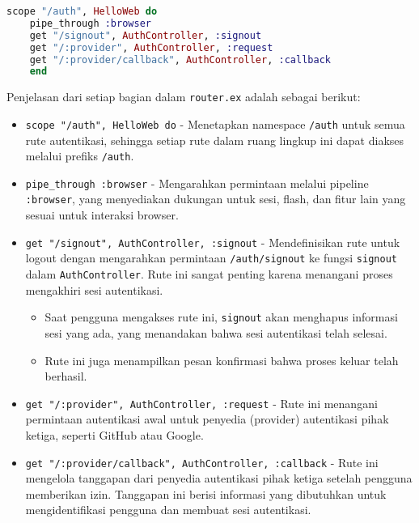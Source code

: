 \begin{lstlisting}[language=Elixir, caption={\texttt{lib/hello\_web/router.ex}}]
	scope "/auth", HelloWeb do
	pipe_through :browser
	get "/signout", AuthController, :signout
	get "/:provider", AuthController, :request
	get "/:provider/callback", AuthController, :callback
	end
\end{lstlisting}

Penjelasan dari setiap bagian dalam \texttt{router.ex} adalah sebagai berikut:

\begin{itemize}
	\item \texttt{scope "/auth", HelloWeb do} - Menetapkan namespace \texttt{/auth} untuk semua rute autentikasi, sehingga setiap rute dalam ruang lingkup ini dapat diakses melalui prefiks \texttt{/auth}.
	\item \texttt{pipe\_through :browser} - Mengarahkan permintaan melalui pipeline \texttt{:browser}, yang menyediakan dukungan untuk sesi, flash, dan fitur lain yang sesuai untuk interaksi browser.
	\item \texttt{get "/signout", AuthController, :signout} - Mendefinisikan rute untuk logout dengan mengarahkan permintaan \texttt{/auth/signout} ke fungsi \texttt{signout} dalam \texttt{AuthController}. Rute ini sangat penting karena menangani proses mengakhiri sesi autentikasi.
	\begin{itemize}
		\item Saat pengguna mengakses rute ini, \texttt{signout} akan menghapus informasi sesi yang ada, yang menandakan bahwa sesi autentikasi telah selesai.
		\item Rute ini juga menampilkan pesan konfirmasi bahwa proses keluar telah berhasil.
	\end{itemize}
	\item \texttt{get "/:provider", AuthController, :request} - Rute ini menangani permintaan autentikasi awal untuk penyedia (provider) autentikasi pihak ketiga, seperti GitHub atau Google.
	\item \texttt{get "/:provider/callback", AuthController, :callback} - Rute ini mengelola tanggapan dari penyedia autentikasi pihak ketiga setelah pengguna memberikan izin. Tanggapan ini berisi informasi yang dibutuhkan untuk mengidentifikasi pengguna dan membuat sesi autentikasi.
\end{itemize}

